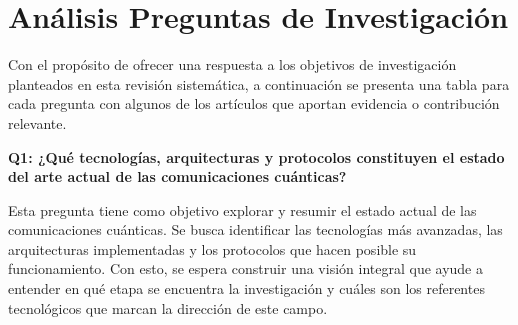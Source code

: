 \section{Análisis Preguntas de Investigación}

Con el propósito de ofrecer una respuesta a los objetivos de investigación planteados en esta revisión sistemática, a continuación se presenta una tabla para cada pregunta con algunos de los artículos que aportan evidencia o contribución relevante.

\vspace{1em} \textbf {Q1: ¿Qué tecnologías, arquitecturas y protocolos constituyen el estado del arte actual de las comunicaciones cuánticas?}

Esta pregunta tiene como objetivo explorar y resumir el estado actual de las comunicaciones cuánticas. Se busca identificar las tecnologías más avanzadas, las arquitecturas implementadas y los protocolos que hacen posible su funcionamiento. Con esto, se espera construir una visión integral que ayude a entender en qué etapa se encuentra la investigación y cuáles son los referentes tecnológicos que marcan la dirección de este campo.

